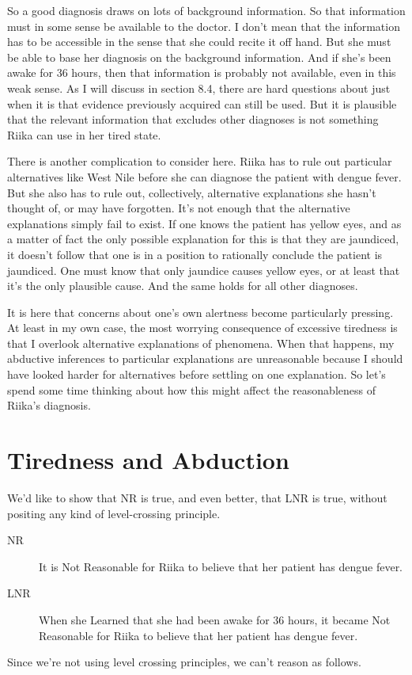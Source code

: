 So a good diagnosis draws on lots of background information. So that information must in some sense be available to the doctor. I don't mean that the information has to be accessible in the sense that she could recite it off hand. But she must be able to base her diagnosis on the background information. And if she's been awake for 36 hours, then that information is probably not available, even in this weak sense. As I will discuss in section 8.4, there are hard questions about just when it is that evidence previously acquired can still be used. But it is plausible that the relevant information that excludes other diagnoses is not something \gls{Riika} can use in her tired state.

There is another complication to consider here. \gls{Riika} has to rule out particular alternatives like West Nile before she can diagnose the patient with dengue fever. But she also has to rule out, collectively, alternative explanations she hasn't thought of, or may have forgotten. It's not enough that the alternative explanations simply fail to exist. If one knows the patient has yellow eyes, and as a matter of fact the only possible explanation for this is that they are jaundiced, it doesn't follow that one is in a position to rationally conclude the patient is jaundiced. One must know that only jaundice causes yellow eyes, or at least that it's the only plausible cause. And the same holds for all other diagnoses.

It is here that concerns about one's own alertness become particularly pressing. At least in my own case, the most worrying consequence of excessive tiredness is that I overlook alternative explanations of phenomena. When that happens, my abductive inferences to particular explanations are unreasonable because I should have looked harder for alternatives before settling on one explanation. So let's spend some time thinking about how this might affect the reasonableness of \gls{Riika}'s diagnosis.

\section{Tiredness and Abduction}
\label{tirednessandabduction}

We'd like to show that NR is true, and even better, that LNR is true, without positing any kind of level-crossing principle.

\begin{description}
\item[NR]

It is Not Reasonable for \gls{Riika} to believe that her patient has dengue fever.

\item[LNR]

When she Learned that she had been awake for 36 hours, it became Not Reasonable for \gls{Riika} to believe that her patient has dengue fever.
\end{description}
Since we're not using level crossing principles, we can't reason as follows.

